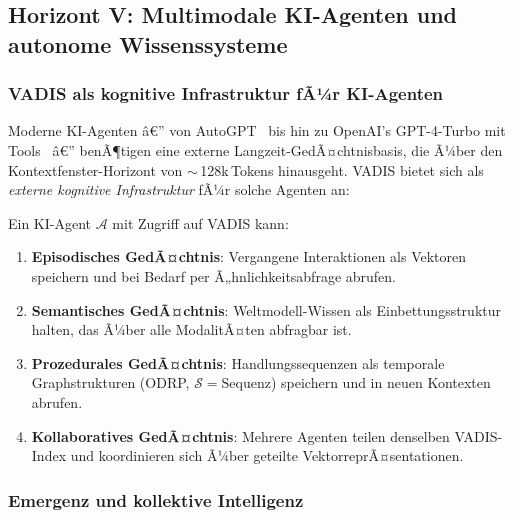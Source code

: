 ﻿\documentclass[12pt,a4paper]{article}
\begin{document}
\subsection{Horizont V: Multimodale KI-Agenten und
            autonome Wissenssysteme}
\label{sub:horizont5}

\subsubsection{VADIS als kognitive Infrastruktur fÃ¼r KI-Agenten}

Moderne KI-Agenten â€” von AutoGPT~\cite{significant2023autogpt}
bis hin zu OpenAI's GPT-4-Turbo mit Tools~\cite{openai2023gpt4} â€”
benÃ¶tigen eine externe Langzeit-GedÃ¤chtnisba\-sis, die Ã¼ber
den Kontextfenster-Horizont von $\sim$\,128k\,Tokens hinausgeht.
VADIS bietet sich als \emph{externe kognitive
Infrastruktur} fÃ¼r solche Agenten an:

\begin{tcolorbox}[keybox, title={Vision: VADIS als ArbeitsgedÃ¤chtnis
                  fÃ¼r KI-Agenten}]
\small
Ein KI-Agent $\mathcal{A}$ mit Zugriff auf VADIS kann:
\begin{enumerate}[leftmargin=1.2em, itemsep=1pt, topsep=2pt]
  \item \textbf{Episodisches GedÃ¤chtnis}: Vergangene
        Interaktionen als Vektoren speichern und bei
        Bedarf per Ã„hnlichkeitsabfrage abrufen.
  \item \textbf{Semantisches GedÃ¤chtnis}: Weltmodell-Wissen
        als Einbettungsstruktur halten, das Ã¼ber
        alle ModalitÃ¤ten abfragbar ist.
  \item \textbf{Prozedurales GedÃ¤chtnis}: Handlungssequenzen
        als temporale Graphstrukturen (ODRP, $\mathcal{S}=\text{Sequenz}$)
        speichern und in neuen Kontexten abrufen.
  \item \textbf{Kollaboratives GedÃ¤chtnis}: Mehrere Agenten
        teilen denselben VADIS-Index und koordinieren
        sich Ã¼ber geteilte VektorreprÃ¤sentationen.
\end{enumerate}
\end{tcolorbox}

\subsubsection{Emergenz und kollektive Intelligenz}
\end{document}
